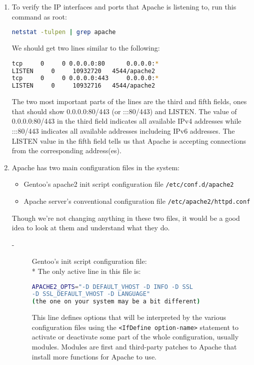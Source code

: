 \documentclass[11pt]{article}
\begin{document}
\begin{enumerate}
  \item To verify the IP interfaces and ports that Apache is listening to, run this command as root:
  \begin{lstlisting}[basicstyle=\ttfamily, backgroundcolor = \color{lightgray}, language = bash, xleftmargin = 0cm, framexleftmargin = 1em]
netstat -tulpen | grep apache
\end{lstlisting}
  We should get two lines similar to the following:
  \begin{lstlisting}[basicstyle=\ttfamily, backgroundcolor = \color{lightgray}, language = bash, xleftmargin = 0cm, framexleftmargin = 1em]
tcp     0     0 0.0.0.0:80      0.0.0.0:*     
LISTEN     0     10932720 	4544/apache2
tcp     0     0 0.0.0.0:443     0.0.0.0:*     
LISTEN     0     10932716 	4544/apache2
\end{lstlisting}
   The two most important parts of the lines are the third and fifth fields, ones that should show 0.0.0.0:80/443 (or :::80/443) and LISTEN. The value of 0.0.0.0:80/443 in the third field indicates all available IPv4 addresses while :::80/443 indicates all available addresses includeing IPv6 addresses. The LISTEN value in the fifth field tells us that Apache is accepting connections from the corresponding address(es).

  \item Apache has two main configuration files in the system:
   \begin{itemize}
    \item Gentoo's apache2 init script configuration file \verb|/etc/conf.d/apache2|
    \item Apache server's conventional configuration file \verb|/etc/apache2/httpd.conf|
   \end{itemize}
   Though we're not changing anything in these two files, it would be a good idea to look at them and understand what they do.
   
   \begin{description}
    \item[-]Gentoo's init script configuration file:
    \\* The only active line in this file is:
    \begin{lstlisting}[basicstyle=\ttfamily, backgroundcolor = \color{lightgray}, language = bash, xleftmargin = 0cm, framexleftmargin = 1em, showstringspaces=false]
APACHE2_OPTS="-D DEFAULT_VHOST -D INFO -D SSL 
-D SSL_DEFAULT_VHOST -D LANGUAGE" 
(the one on your system may be a bit different)
\end{lstlisting}
       This line defines options that will be interpreted by the various configuration files using the \verb|<IfDefine option-name>| statement to activate or deactivate some part of the whole configuration, usually modules. Modules are first and third-party patches to Apache that install more functions for Apache to use.
     

\end{description}
\end{enumerate}
\end{document}
